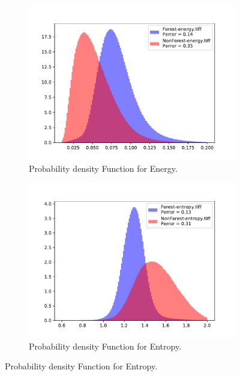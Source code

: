 \begin{figure}[H]
\begin{subfigure}[b]{0.4\linewidth}
    \includegraphics[width=\linewidth]{Chapter5/SENTINEL1/Coherence/energy_histogram.pdf}
     \caption{Probability density Function for Energy.}
  \end{subfigure}
  \centering
  \begin{subfigure}[b]{0.4\linewidth}
    \includegraphics[width=\linewidth]{Chapter5/SENTINEL1/Coherence/entropy_histogram.pdf}
     \caption{Probability density Function for Entropy.}
  \end{subfigure}
\end{figure}

